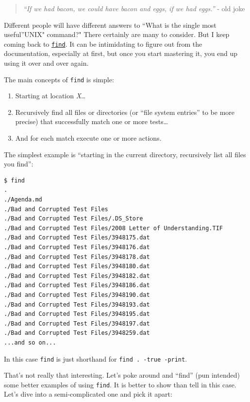\documentclass[10pt,]{book}
\numberwithin{figure}{chapter}
\begin{document}
\begin{quote}
\emph{``If we had bacon, we could have bacon and eggs, if we had
eggs.''} - old joke
\end{quote}

Different people will have different answers to ``What is the single
most useful''UNIX" command?" There certainly are many to consider. But I
keep coming back to
\href{http://linux.die.net/man/1/find}{\texttt{find}}. It can be
intimidating to figure out from the documentation, especially at first,
but once you start mastering it, you end up using it over and over
again.

The main concepts of \texttt{find} is simple:

\begin{enumerate}
\def\labelenumi{\arabic{enumi}.}
\item
  Starting at location \emph{X}\ldots{}
\item
  Recursively find all files or directories (or ``file system entries''
  to be more precise) that successfully match one or more tests\ldots{}
\item
  And for each match execute one or more actions.
\end{enumerate}

The simplest example is ``starting in the current directory, recursively
list all files you find'':

\begin{verbatim}
$ find
.
./Agenda.md
./Bad and Corrupted Test Files
./Bad and Corrupted Test Files/.DS_Store
./Bad and Corrupted Test Files/2008 Letter of Understanding.TIF
./Bad and Corrupted Test Files/3948175.dat
./Bad and Corrupted Test Files/3948176.dat
./Bad and Corrupted Test Files/3948178.dat
./Bad and Corrupted Test Files/3948180.dat
./Bad and Corrupted Test Files/3948182.dat
./Bad and Corrupted Test Files/3948186.dat
./Bad and Corrupted Test Files/3948190.dat
./Bad and Corrupted Test Files/3948193.dat
./Bad and Corrupted Test Files/3948195.dat
./Bad and Corrupted Test Files/3948197.dat
./Bad and Corrupted Test Files/3948259.dat
...and so on...
\end{verbatim}

In this case \texttt{find} is just shorthand for
\texttt{find . -true -print}.

That's not really that interesting. Let's poke around and ``find'' (pun
intended) some better examples of using \texttt{find}. It is better to
show than tell in this case. Let's dive into a semi-complicated one and
pick it apart:
\end{document}
